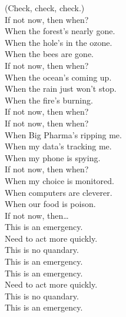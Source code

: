 
\label{album:lw}





(Check, check, check.) \\

If not now, then when? \\

When the forest's nearly gone. \\
When the hole's in the ozone. \\
When the bees are gone. \\
If not now, then when? \\

When the ocean's coming up. \\
When the rain just won't stop. \\
When the fire's burning. \\
If not now, then when? \\

If not now, then when? \\
When Big Pharma's ripping me. \\
When my data's tracking me. \\
When my phone is spying. \\
If not now, then when? \\

When my choice is monitored. \\
When computers are cleverer. \\
When our food is poison. \\
If not now, then… \\

This is an emergency. \\
Need to act more quickly. \\
This is no quandary. \\
This is an emergency. \\

This is an emergency. \\
Need to act more quickly. \\
This is no quandary. \\
This is an emergency. \\

